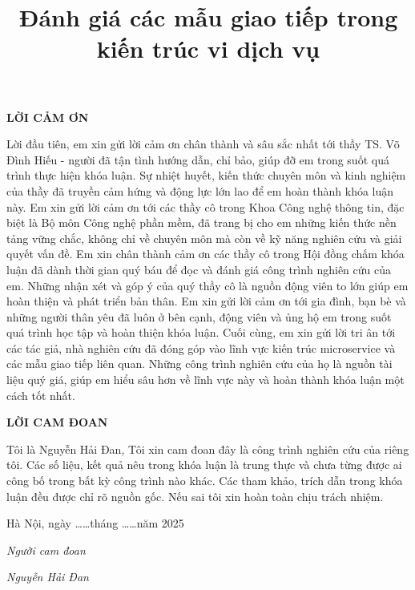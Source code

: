 \documentclass{uetgraduation}
\title{Đánh giá các mẫu giao tiếp trong kiến trúc vi dịch vụ}
\begin{document}
\makecovers

\newpage
\thispagestyle{empty}
\begin{center}
    \textbf{LỜI CẢM ƠN}
\end{center}

Lời đầu tiên, em xin gửi lời cảm ơn chân thành và sâu sắc nhất tới thầy TS. Võ Đình Hiếu - người đã tận tình hướng dẫn, chỉ bảo, giúp đỡ em trong suốt quá trình thực hiện khóa luận. Sự nhiệt huyết, kiến thức chuyên môn và kinh nghiệm của thầy đã truyền cảm hứng và động lực lớn lao để em hoàn thành khóa luận này.
Em xin gửi lời cảm ơn tới các thầy cô trong Khoa Công nghệ thông tin, đặc biệt là Bộ môn Công nghệ phần mềm, đã trang bị cho em những kiến thức nền tảng vững chắc, không chỉ về chuyên môn mà còn về kỹ năng nghiên cứu và giải quyết vấn đề.
Em xin chân thành cảm ơn các thầy cô trong Hội đồng chấm khóa luận đã dành thời gian quý báu để đọc và đánh giá công trình nghiên cứu của em. Những nhận xét và góp ý của quý thầy cô là nguồn động viên to lớn giúp em hoàn thiện và phát triển bản thân.
Em xin gửi lời cảm ơn tới gia đình, bạn bè và những người thân yêu đã luôn ở bên cạnh, động viên và ủng hộ em trong suốt quá trình học tập và hoàn thiện khóa luận.
Cuối cùng, em xin gửi lời tri ân tới các tác giả, nhà nghiên cứu đã đóng góp vào lĩnh vực kiến trúc microservice và các mẫu giao tiếp liên quan. Những công trình nghiên cứu của họ là nguồn tài liệu quý giá, giúp em hiểu sâu hơn về lĩnh vực này và hoàn thành khóa luận một cách tốt nhất.

\newpage
\thispagestyle{empty}
\begin{center}
    \textbf{LỜI CAM ĐOAN}
\end{center}

Tôi là Nguyễn Hải Đan, Tôi xin cam đoan đây là công trình nghiên cứu của riêng tôi. Các số liệu, kết quả nêu trong khóa luận là trung thực và chưa từng được ai công bố trong bất kỳ công trình nào khác. Các tham khảo, trích dẫn trong khóa luận đều được chỉ rõ nguồn gốc. Nếu sai tôi xin hoàn toàn chịu trách nhiệm.

\begin{flushright}
    Hà Nội, ngày \ldots\ldots tháng \ldots\ldots năm 2025

    \vspace{2cm}
    \textit{Người cam đoan}

    \vspace{1cm}
    \textit{Nguyễn Hải Đan}
\end{flushright}
\end{document}
